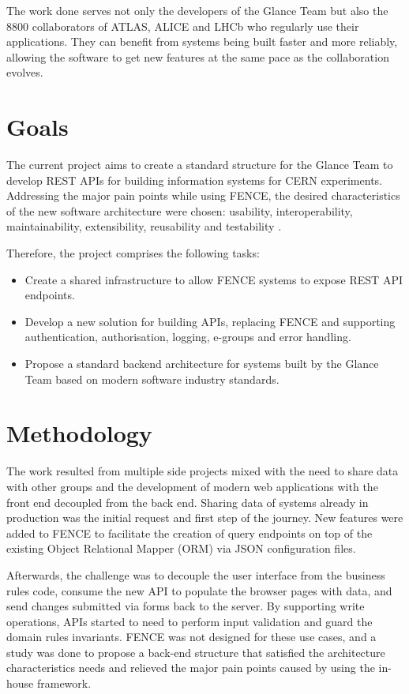 The work done serves not only the developers of the Glance Team but also the 8800 collaborators of ATLAS, ALICE and LHCb who regularly use their applications. They can benefit from systems being built faster and more reliably, allowing the software to get new features at the same pace as the collaboration evolves.

\section{Goals}

The current project aims to create a standard structure for the Glance Team to develop REST APIs for building information systems for CERN experiments. Addressing the major pain points while using FENCE, the desired characteristics of the new software architecture were chosen: usability, interoperability, maintainability, extensibility, reusability and testability \cite{richards-architecture}. 

Therefore, the project comprises the following tasks:
\begin{itemize}
    \item Create a shared infrastructure to allow FENCE systems to expose REST API endpoints.
    \item Develop a new solution for building APIs, replacing FENCE and supporting authentication, authorisation, logging, e-groups and error handling.
    \item Propose a standard backend architecture for systems built by the Glance Team based on modern software industry standards.
\end{itemize}


\section{Methodology}

The work resulted from multiple side projects mixed with the need to share data with other groups and the development of modern web applications with the front end decoupled from the back end. Sharing data of systems already in production was the initial request and first step of the journey. New features were added to FENCE to facilitate the creation of query endpoints on top of the existing Object Relational Mapper (ORM) via JSON configuration files.

Afterwards, the challenge was to decouple the user interface from the business rules code, consume the new API to populate the browser pages with data, and send changes submitted via forms back to the server. By supporting write operations, APIs started to need to perform input validation and guard the domain rules invariants. FENCE was not designed for these use cases, and a study was done to propose a back-end structure that satisfied the architecture characteristics needs and relieved the major pain points caused by using the in-house framework.

